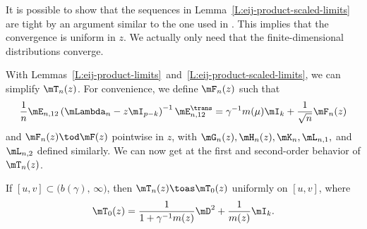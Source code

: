 \begin{remark}
    It is possible to show that the sequences in Lemma~\ref{L:eij-product-scaled-limits} are tight by an argument similar to the one used in \cite{onatski2009}.  This implies that the convergence is uniform in $z$.  We actually only need that the finite-dimensional distributions converge.
\end{remark}

With Lemmas~\ref{L:eij-product-limits}~and~\ref{L:eij-product-scaled-limits},
we can simplify $\mT_n(z)$.  For convenience, we define
$\mF_n (z)$ such that
\[
    \frac{1}{n}
    \mE_{n,12}
    \left(
        \mLambda_n
        -
        z
        \mI_{p-k}
    \right)^{-1}
    \mE_{n,12}^\trans
        =
            \gamma^{-1}
            m(\mu)
            \mI_k
            +
            \frac{1}{\sqrt{n}}
            \mF_n(z)
\]
and $\mF_n(z) \tod \mF(z)$ pointwise in $z$,
with $\mG_n(z), \mH_n(z), \mK_n, \mL_{n,1},$ and $\mL_{n,2}$ defined similarly.  We can now get at the first and second-order behavior of $\mT_n(z)$.

\begin{lemma}
    If $[u,v] \subset \big( b(\gamma), \, \infty \big)$, then
    \(
        \mT_n( z )
            \toas
                \mT_0( z )
    \)
    uniformly on $[u,v]$, where
    \[
        \mT_0( z )
            =
                \frac{1}{ 1 + \gamma^{-1} m(z) }
                \mD^2 
                +
                \frac{1}{m(z)}
                \mI_k.
    \]
\end{lemma}

